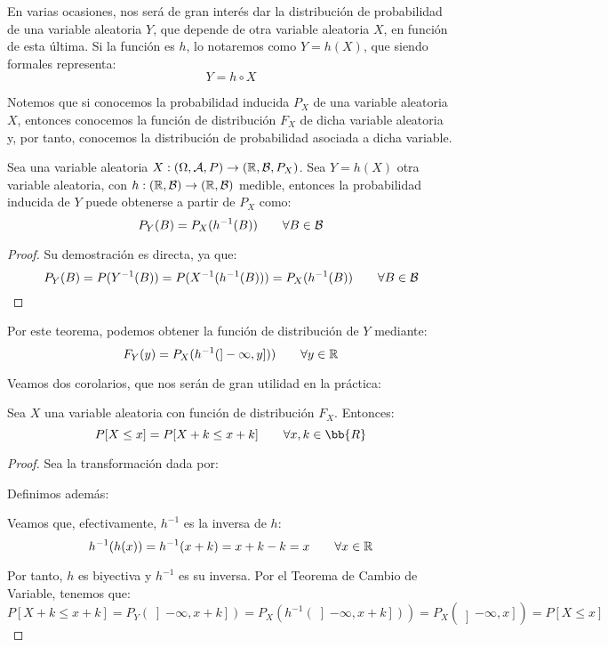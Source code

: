 En varias ocasiones, nos será de gran interés dar la distribución de probabilidad de una variable aleatoria $Y$, que depende de otra variable aleatoria $X$, en función de esta última. Si la función es $h$, lo notaremos como $Y=h(X)$, que siendo formales representa:
\begin{equation*}
    Y=h\circ X
\end{equation*}

Notemos que si conocemos la probabilidad inducida $P_X$ de una variable aleatoria $X$, entonces conocemos la función de distribución $F_X$ de dicha variable aleatoria y, por tanto, conocemos la distribución de probabilidad asociada a dicha variable.

\begin{teo}
  Sea una variable aleatoria $X: (\Omega, \mathcal{A}, P) \rightarrow (\mathbb R, \mathcal{B}, P_X)$.
  Sea $Y=h(X)$ otra variable aleatoria, con $h:(\mathbb R, \mathcal{B}) \rightarrow (\mathbb R, \mathcal{B})$ medible, entonces la probabilidad inducida de $Y$ puede obtenerse a partir de $P_X$ como:
  $$P_Y(B) = P_X(h^{-1}(B)) \qquad \forall B \in \mathcal{B}$$
\end{teo}
\begin{proof} Su demostración es directa, ya que:
  $$P_Y(B) = P(Y^{-1}(B)) = P(X^{-1}(h^{-1}(B))) = P_X(h^{-1}(B)) \qquad \forall B \in \mathcal{B}$$
\end{proof}

Por este teorema, podemos obtener la función de distribución de $Y$ mediante:
$$F_Y(y) = P_X(h^{-1}(]-\infty, y])) \qquad \forall y\in \mathbb R$$

Veamos dos corolarios, que nos serán de gran utilidad en la práctica:
\begin{coro}
    Sea $X$ una variable aleatoria con función de distribución $F_X$. Entonces:
    \begin{equation*}
        P[X\leq x] = P[X+k\leq x+k]\qquad \forall x,k \in \bb{R}
    \end{equation*}
\end{coro}
\begin{proof}
    Sea la transformación dada por:
    
    Definimos además:

    Veamos que, efectivamente, $h^{-1}$ es la inversa de $h$:
    $$h^{-1}(h(x)) = h^{-1}(x+k) = x+k-k = x\qquad \forall x \in \mathbb R$$

    Por tanto, $h$ es biyectiva y $h^{-1}$ es su inversa. Por el Teorema de Cambio de Variable, tenemos que:
    $$P[X+k\leq x+k] = P_Y(\left]-\infty, x+k\right]) = P_X(h^{-1}(\left]-\infty, x+k\right])) = P_X(\left]-\infty, x\right]) = P[X\leq x]$$
\end{proof}

